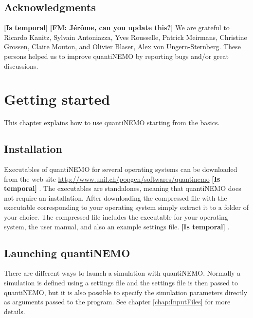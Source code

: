 \documentclass[letterpaper,12pt,oneside]{book}
\newcommand{\fm}[1]{\small {\bf \color{blue} [FM:  #1]} \normalsize}
\newcommand{\tbc}[1]{\small {\bf \color{red} [Is temporal]} \normalsize} %
\begin{document}
\section{Acknowledgments}
\tbc{}\fm{Jérôme, can you update this?}
We are grateful to Ricardo Kanitz, Sylvain Antoniazza, Yves Rousselle, Patrick Meirmans, Christine Grossen, Claire Mouton, and Olivier Blaser, Alex von Ungern-Sternberg. These persons helped us to improve quantiNEMO by reporting bugs and/or great discussions. 




\newpage
\chapter{Getting started}
\label{chap:GettingStarted}
This chapter explains how to use quantiNEMO starting from the basics. 


\section{Installation}
Executables of quantiNEMO for several operating systems can be downloaded from the web site \url{http://www.unil.ch/popgen/softwares/quantinemo} \tbc{}. The executables are standalones, meaning that quantiNEMO does not require an installation. After downloading the compressed file with the executable corresponding to your operating system simply extract it to a folder of your choice. The compressed file includes the executable for your operating system, the user manual, and also an example settings file.\tbc{}.


\section{Launching quantiNEMO}\label{launchQuantiNEMO}
There are different ways to launch a simulation with quantiNEMO. Normally a simulation is defined using a settings file and the settings file is then passed to quantiNEMO, but it is also possible to specify the simulation parameters directly as arguments passed to the program. See chapter \ref{chap:InputFiles} for more details. 
\end{document}
